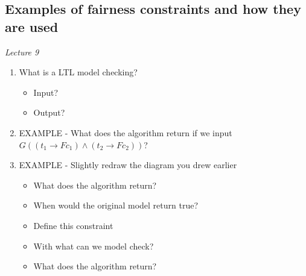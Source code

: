 \documentclass[fleqn]{article}
\begin{document}
\subsection{Examples of fairness constraints and how they are used}
\textit{Lecture 9}
\begin{enumerate}
    \item What is a LTL model checking?
    \begin{itemize}
        \item Input?
        \item Output?
    \end{itemize}
    \item EXAMPLE - What does the algorithm return if we input $G ((t_1 \rightarrow Fc_1) \wedge (t_2 \rightarrow Fc_2))$?
    \item EXAMPLE - Slightly redraw the diagram you drew earlier
    \begin{itemize}
        \item What does the algorithm return?
        \item When would the original model return true?
        \item Define this constraint
        \item With what can we model check?
        \item What does the algorithm return?
    \end{itemize}
\end{enumerate}
\end{document}
